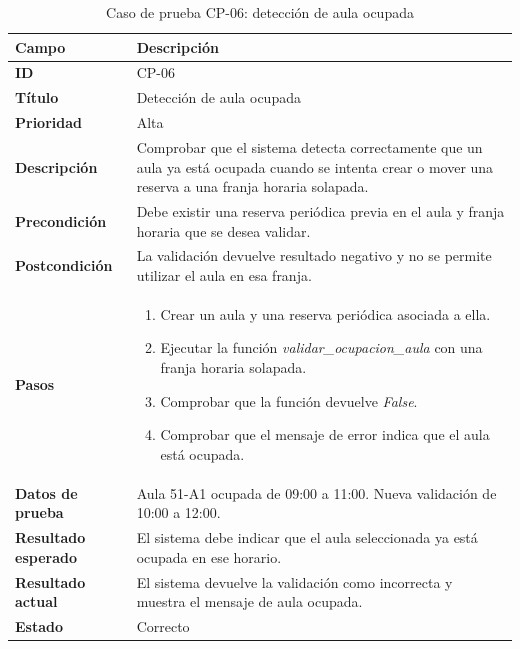 \begin{table}[H]
	\centering
	\small
	\renewcommand{\arraystretch}{1.2}
	\begin{tabularx}{\textwidth}{@{}p{3.5cm}X@{}}
		\toprule
		\textbf{Campo} & \textbf{Descripción} \\
		\midrule
		\textbf{ID} & CP-06 \\
		\textbf{Título} & Detección de aula ocupada \\
		\textbf{Prioridad} & Alta \\
		\textbf{Descripción} & Comprobar que el sistema detecta correctamente que un aula ya está ocupada cuando se intenta crear o mover una reserva a una franja horaria solapada. \\
		\textbf{Precondición} & Debe existir una reserva periódica previa en el aula y franja horaria que se desea validar. \\
		\textbf{Postcondición} & La validación devuelve resultado negativo y no se permite utilizar el aula en esa franja. \\
		\textbf{Pasos} &
		\begin{enumerate}
			\item Crear un aula y una reserva periódica asociada a ella.
			\item Ejecutar la función \textit{validar\_ocupacion\_aula} con una franja horaria solapada.
			\item Comprobar que la función devuelve \textit{False}.
			\item Comprobar que el mensaje de error indica que el aula está ocupada.
		\end{enumerate} \\
		\textbf{Datos de prueba} & Aula 51-A1 ocupada de 09:00 a 11:00. Nueva validación de 10:00 a 12:00. \\
		\textbf{Resultado esperado} & El sistema debe indicar que el aula seleccionada ya está ocupada en ese horario. \\
		\textbf{Resultado actual} & El sistema devuelve la validación como incorrecta y muestra el mensaje de aula ocupada. \\
		\textbf{Estado} & Correcto \\
		\bottomrule
	\end{tabularx}
	\caption{Caso de prueba CP-06: detección de aula ocupada}
	\label{tab}
\end{table}


